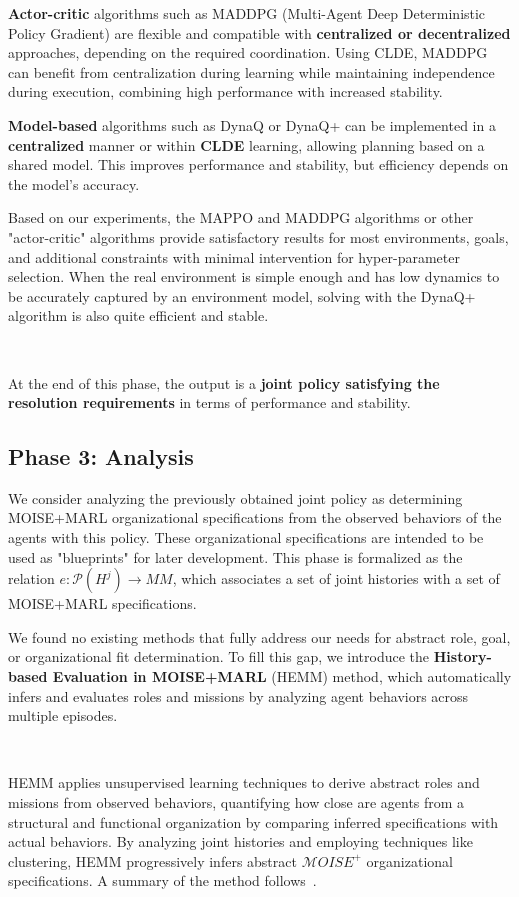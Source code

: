 \documentclass[conference]{IEEEtran}
\begin{document}
\textbf{Actor-critic} algorithms such as MADDPG (Multi-Agent Deep Deterministic Policy Gradient) are flexible and compatible with \textbf{centralized or decentralized} approaches, depending on the required coordination. Using CLDE, MADDPG can benefit from centralization during learning while maintaining independence during execution, combining high performance with increased stability.

\textbf{Model-based} algorithms such as DynaQ or DynaQ+ can be implemented in a \textbf{centralized} manner or within \textbf{CLDE} learning, allowing planning based on a shared model. This improves performance and stability, but efficiency depends on the model's accuracy.

Based on our experiments, the MAPPO and MADDPG algorithms or other "actor-critic" algorithms provide satisfactory results for most environments, goals, and additional constraints with minimal intervention for hyper-parameter selection. When the real environment is simple enough and has low dynamics to be accurately captured by an environment model, solving with the DynaQ+ algorithm is also quite efficient and stable.

\

At the end of this phase, the output is a \textbf{joint policy satisfying the resolution requirements} in terms of performance and stability.

\subsection{Phase 3: Analysis}

We consider analyzing the previously obtained joint policy as determining MOISE+MARL organizational specifications from the observed behaviors of the agents with this policy. These organizational specifications are intended to be used as "blueprints" for later development. This phase is formalized as the relation $e: \mathcal{P}(H^{j}) \to MM$, which associates a set of joint histories with a set of MOISE+MARL specifications.

We found no existing methods that fully address our needs for abstract role, goal, or organizational fit determination. To fill this gap, we introduce the \textbf{History-based Evaluation in MOISE+MARL} (HEMM) method, which automatically infers and evaluates roles and missions by analyzing agent behaviors across multiple episodes.

\

\noindent HEMM applies unsupervised learning techniques to derive abstract roles and missions from observed behaviors, quantifying how close are agents from a structural and functional organization by comparing inferred specifications with actual behaviors. By analyzing joint histories and employing techniques like clustering, HEMM progressively infers abstract $\mathcal{M}OISE^+$ organizational specifications. A summary of the method follows~\hyperref[fn:github]{\footnotemark[1]}.
%
\end{document}
